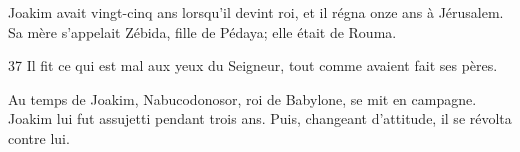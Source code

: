  Joakim avait vingt-cinq ans lorsqu’il devint roi, et il régna onze ans à Jérusalem. Sa mère s’appelait Zébida, fille de Pédaya; elle était de Rouma.

37 Il fit ce qui est mal aux yeux du Seigneur, tout comme avaient fait ses pères.

Au temps de Joakim, Nabucodonosor, roi de Babylone, se mit en campagne. Joakim lui fut assujetti pendant trois ans. Puis, changeant d’attitude, il se révolta contre lui.
